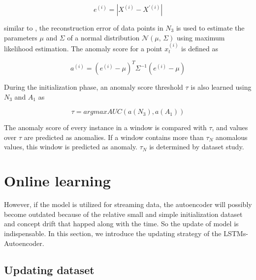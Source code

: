 \begin{equation} \label{eq:error}
e^{(i)}=\left| X^{(i)} - X^{'(i)} \right|
\end{equation}

similar to \cite{encdecad}, the reconstruction error of data points in $N_3$ is used to estimate the parameters $\mu$ and $\Sigma$ of a normal distribution $\mathcal{N}(\mu,\,\Sigma)$ using maximum likelihood estimation. The anomaly score for a point $x_t^{(i)}$ is defined as 

\begin{equation} \label{eq:score}
a^{(i)}={(e^{(i)}-\mu)}^{T}{\Sigma}^{-1}{(e^{(i)}-\mu)}
\end{equation}

During the initialization phase, an anomaly score threshold $\tau$ is also learned using $N_3$ and $A_1$ as

\begin{equation} \label{eq:threshold}
\tau = argmax AUC(a(N_3),a(A_1))
\end{equation}

The anomaly score of every instance in a window is compared with $\tau$, and values over $\tau$ are predicted as anomalies. If a window contains more than $\tau_N$ anomalous values, this window is predicted as anomaly. $\tau_N$ is determined by dataset study.\\

\section{Online learning}
\label{sec:Onlinelearning}
However, if the model is utilized for streaming data, the autoencoder will possibly become outdated because of the relative small and simple initialization dataset and concept drift that happed along with the time. So the update of model is indispensable. In this section, we introduce the updating strategy of the LSTMs-Autoencoder.

\subsection{Updating dataset}
\label{data}

